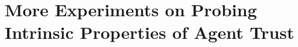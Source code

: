 \section{More Experiments on Probing Intrinsic Properties of Agent Trust}
\label{race_analysis}







